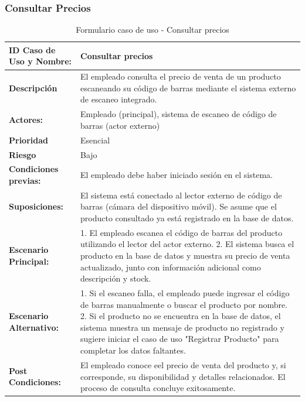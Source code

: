 \documentclass[twoside]{article}
\begin{document}
\subsubsection{Consultar Precios}
\begin{table}[!htbp]
\centering
\caption{Formulario caso de uso - Consultar precios}
\begin{tabular}{|l|p{29em}|} 
\toprule
\rowcolor[rgb]{ .635, .973, .882} \textbf{ID Caso de Uso y Nombre:} & \cellcolor[rgb]{ .867, .922, .969} Consultar precios \\
\midrule
\rowcolor[rgb]{ .635, .973, .882} \textbf{Descripción} & \cellcolor[rgb]{ .867, .922, .969}El empleado consulta el precio de venta de un producto escaneando su código de barras mediante el sistema externo de escaneo integrado. \\
\midrule
\rowcolor[rgb]{ .635, .973, .882} \textbf{Actores:} & \cellcolor[rgb]{ .867, .922, .969} Empleado (principal), sistema de escaneo de código de barras (actor externo) \\
\midrule
\rowcolor[rgb]{ .635, .973, .882} \textbf{Prioridad} & \cellcolor[rgb]{ .867, .922, .969} Esencial \\
\midrule
\rowcolor[rgb]{ .635, .973, .882} \textbf{Riesgo} & \cellcolor[rgb]{ .867, .922, .969} Bajo \\
\midrule
\rowcolor[rgb]{ .635, .973, .882} \textbf{Condiciones previas:} & \cellcolor[rgb]{ .867, .922, .969} El empleado debe haber iniciado sesión en el sistema. \\
\midrule
\rowcolor[rgb]{ .635, .973, .882} \textbf{Suposiciones:} & \cellcolor[rgb]{ .867, .922, .969} El sistema está conectado al lector externo de código de barras (cámara del dispositivo móvil). Se asume que el producto consultado ya está registrado en la base de datos. \\
\midrule
\rowcolor[rgb]{ .635, .973, .882} \textbf{Escenario Principal:} & \cellcolor[rgb]{ .867, .922, .969} 1. El empleado escanea el código de barras del producto utilizando el lector del actor externo.\newline{} 2. El sistema busca el producto en la base de datos y muestra su precio de venta actualizado, junto con información adicional como descripción y stock. \\
\midrule
\rowcolor[rgb]{ .635, .973, .882} \textbf{Escenario Alternativo:} & \cellcolor[rgb]{ .867, .922, .969} 1. Si el escaneo falla, el empleado puede ingresar el código de barras manualmente o buscar el producto por nombre.\newline{} 2. Si el producto no se encuentra en la base de datos, el sistema muestra un mensaje de producto no registrado y sugiere iniciar el caso de uso "Registrar Producto" para completar los datos faltantes. \\
\midrule
\rowcolor[rgb]{ .635, .973, .882} \textbf{Post Condiciones:} & \cellcolor[rgb]{ .867, .922, .969} El empleado conoce eel precio de venta del producto y, si corresponde, su disponibilidad y detalles relacionados. El proceso de consulta concluye exitosamente. \\
\bottomrule
\end{tabular}
\label{tab:addlabel}
\end{table}
\end{document}
